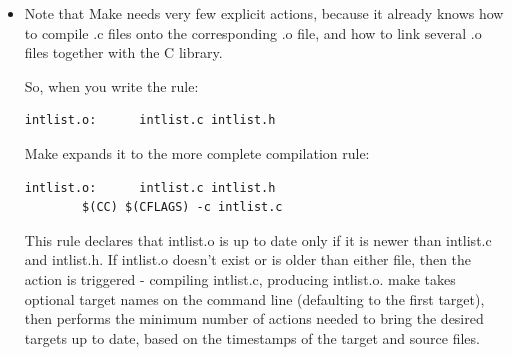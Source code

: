 \documentclass[aspectratio=169]{beamer}
\begin{document}
\begin{frame}[fragile]

\begin{itemize}
      \item
	Note that Make needs very few explicit actions,
	because it already knows how to compile \alert{.c} files onto the corresponding \alert{.o} file, and how to link several \alert{.o} files together with the C library.

      \pitem
      So, when you write the rule:
\begin{verbatim}
intlist.o:      intlist.c intlist.h
\end{verbatim}

      \pause
      Make expands it to the more complete compilation rule:

\begin{verbatim}
intlist.o:      intlist.c intlist.h
        $(CC) $(CFLAGS) -c intlist.c
\end{verbatim}

      \pitem
	This rule declares that \alert{intlist.o} is up
	to date only if it is \alert{newer than intlist.c and intlist.h}.
	If \alert{intlist.o doesn't exist} or \alert{is older than either file},
	then the action is triggered - compiling \alert{intlist.c}, producing \alert{intlist.o}.
      \pitem
        \alert{make} takes optional target names on the command line
	(defaulting to the first target),
        then performs the \alert{minimum number of actions}
	needed to bring the desired targets \alert{up to date},
	based on the \alert{timestamps} of the target and source files.
	
%

\end{itemize}

\end{frame}
\end{document}
